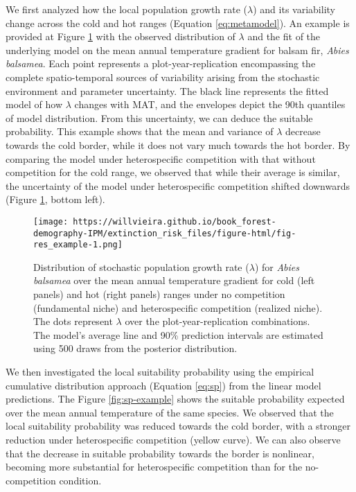 \documentclass[12pt]{article}
\begin{document}
We first analyzed how the local population growth rate (\(\lambda\)) and
its variability change across the cold and hot ranges (Equation
\ref{eq:metamodel}). An example is provided at Figure
\ref{fig:res_example} with the observed distribution of \(\lambda\) and
the fit of the underlying model on the mean annual temperature gradient
for balsam fir, \emph{Abies balsamea}. Each point represents a
plot-year-replication encompassing the complete spatio-temporal sources
of variability arising from the stochastic environment and parameter
uncertainty. The black line represents the fitted model of how
\(\lambda\) changes with MAT, and the envelopes depict the 90th
quantiles of model distribution. From this uncertainty, we can deduce
the suitable probability. This example shows that the mean and variance
of \(\lambda\) decrease towards the cold border, while it does not vary
much towards the hot border. By comparing the model under heterospecific
competition with that without competition for the cold range, we
observed that while their average is similar, the uncertainty of the
model under heterospecific competition shifted downwards (Figure
\ref{fig:res_example}, bottom left).

\begin{figure}
\hypertarget{fig:res_example}{%
\centering
\texttt{[image: https://willvieira.github.io/book\_forest-demography-IPM/extinction\_risk\_files/figure-html/fig-res\_example-1.png]}
\caption{Distribution of stochastic population growth rate (\(\lambda\))
for \emph{Abies balsamea} over the mean annual temperature gradient for
cold (left panels) and hot (right panels) ranges under no competition
(fundamental niche) and heterospecific competition (realized niche). The
dots represent \(\lambda\) over the plot-year-replication combinations.
The model's average line and 90\% prediction intervals are estimated
using 500 draws from the posterior distribution.}\label{fig:res_example}
}
\end{figure}

We then investigated the local suitability probability using the
empirical cumulative distribution approach (Equation \ref{eq:sp}) from
the linear model predictions. The Figure \ref{fig:sp-example} shows the
suitable probability expected over the mean annual temperature of the
same species. We observed that the local suitability probability was
reduced towards the cold border, with a stronger reduction under
heterospecific competition (yellow curve). We can also observe that the
decrease in suitable probability towards the border is nonlinear,
becoming more substantial for heterospecific competition than for the
no-competition condition.
\end{document}
